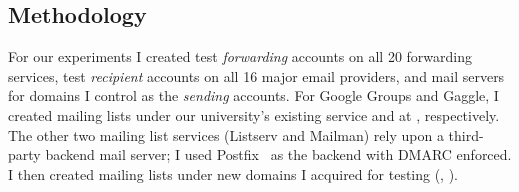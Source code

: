 
\subsection{Methodology}
\label{sec:methodology}


For our experiments I created test \textit{forwarding} accounts on all 20 forwarding services,
test \textit{recipient} accounts on all 16 major
email providers, and mail servers for domains I control as
the \textit{sending} accounts.
%
%
For Google Groups and Gaggle, I created mailing lists under our
university's existing service and at , respectively.
The other two mailing list services (Listserv and Mailman) rely upon a
third-party backend mail server; I used
Postfix~\cite{ThePostf34:online} as the backend with DMARC
enforced. I then created mailing lists under new domains I acquired
for testing (\eg, ).



